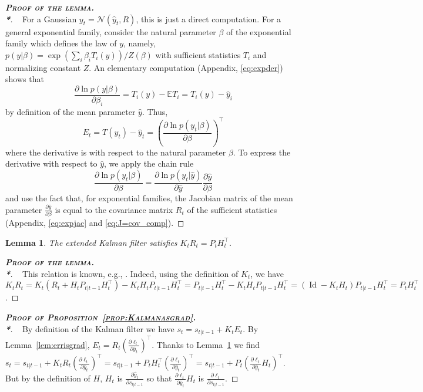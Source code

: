 \documentclass[11pt,a4paper]{article}
\newcommand{\thmheadercommand}[1]{\textbf{\scshape{}#1.\\*}}
\def\ds{\displaystyle}
\newcommand{\E}{\mathbb{E}}
\DeclareMathOperator{\Id}{Id}
\newcommand{\1}{\mathbbm{1}}
\newenvironment{dem}[1][]{\begin{proof}[\thmheadercommand{Proof#1}]~\newline\ignorespaces}{\end{proof}}
\theoremstyle{yannthm}
\newtheorem{lem}[defi]{Lemma}
\theoremstyle{yannthm2}
\newcommand{\transp}[1]{#1^{\!\top}\!}
\newcommand{\gaussian}{\mathcal{N}}
\numberwithin{equation}{section}
\begin{document}
\begin{dem}[ of the lemma]
For a Gaussian $y_t=\gaussian(\hat y_t,R)$, this is just a direct
computation. For a general exponential family,
consider the natural parameter $\beta$ of the exponential family which
defines the law of $y$, namely, $p(y|\beta)=\exp(\sum_i \beta_i T_i(y))/Z(\beta)$
with sufficient statistics $T_i$ and normalizing constant $Z$. An
elementary computation (Appendix, \eqref{eq:expder}) shows that
\begin{equation}
\frac{\partial \ln p(y|\beta)}{\partial \beta_i}=T_i(y)-\E T_i=T_i(y)-\hat y_i
\end{equation}
by definition of the mean parameter $\hat y$. Thus,
\begin{equation}
E_t=T(y_t)-\hat y_t =\transp{\left(\frac{\partial \ln p(y_t|\beta)}{\partial \beta}\right)}
\end{equation}
where the derivative is with respect to the natural parameter $\beta$. To
express the derivative with respect to $\hat y$, we apply the chain rule
\[
\frac{\partial \ln p(y_t|\beta)}{\partial \beta}=\frac{\partial \ln
p(y_t|\hat y)}{\partial \hat y}\frac{\partial \hat y}{\partial \beta}
\]
and use the fact that, for exponential families, the Jacobian matrix of the
mean parameter $\frac{\partial \hat y}{\partial \beta}$ is equal to the
covariance matrix $R_t$ of the
sufficient statistics (Appendix, \eqref{eq:expjac} and
\eqref{eq:J=cov_comp}).
\end{dem}

\begin{lem}
\label{lem:KR=PH}
The extended Kalman filter satisfies $K_tR_t=P_t \transp{H_t}$.
\end{lem}


\begin{dem}[ of the lemma]
This relation is known, e.g., \cite[(6.34)]{simon2006kalmanbook}.
Indeed,
using the definition of $K_t$, we have
$K_tR_t=K_t(R_t+H_tP_{t|t-1}\transp{H_t})-K_tH_tP_{t|t-1}\transp{H_t}=P_{t|t-1}\transp{H_t}-K_t
H_tP_{t|t-1}\transp{H_t}=(\Id-K_tH_t)P_{t|t-1}\transp{H_t}=P_t\transp{H_t}$.
\end{dem}


\begin{dem}[ of Proposition~\ref{prop:Kalmanasgrad}]
By definition of the Kalman filter we have
$s_{t}=s_{t|{t-1}}+K_{t}E_{t}$. By Lemma~\ref{lem:errisgrad},
$\ds E_{t}=R_{t}\transp{\left(\frac{\partial \ell_t}{\partial \hat y_t}\right)}$.
Thanks to Lemma~\ref{lem:KR=PH} we find
$\ds s_{t}=s_{t|{t-1}}+K_{t}R_{t}\transp{\left(\frac{\partial \ell_t}{\partial
\hat y_t}\right)}=s_{t|{t-1}}+P_{t}\transp{H_{t}}\transp{\left(\frac{\partial
\ell_t}{\partial \hat y_t}\right)}=s_{t|{t-1}}+P_{t}\transp{\left(\frac{\partial
\ell_t}{\partial \hat y_t} H_{t}\right)}$. But by the definition of $H$, $H_{t}$
is $\ds \frac{\partial \hat y_{t}}{\partial s_{t|{t-1}}}$ so that $\ds \frac{\partial
\ell_t}{\partial \hat y_t} H_{t}$ is $\ds \frac{\partial \ell_t}{\partial s_{t|{t-1}}}$.
\end{dem}
\end{document}
